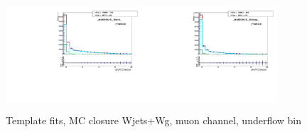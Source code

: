 \begin{figure}[htb]
  \begin{center}
   \includegraphics[width=0.45\textwidth]{../figs/figs_v11/MUON_WGamma/MCclosureWjetsPlusWg/c_TEMPL_CHISO_UNblind__phoEt10to15__Barrel__RooFit_MCclosure.pdf}\includegraphics[width=0.45\textwidth]{../figs/figs_v11/MUON_WGamma/MCclosureWjetsPlusWg/c_TEMPL_CHISO_UNblind__phoEt10to15__Endcap__RooFit_MCclosure.pdf}\\
  \label{fig:templateFits_MCclosureWjetsPlusWg_CHISO_MUON_0}
  \caption{Template fits, MC closure Wjets+Wg, muon channel, underflow bin}
  \end{center}
\end{figure}

